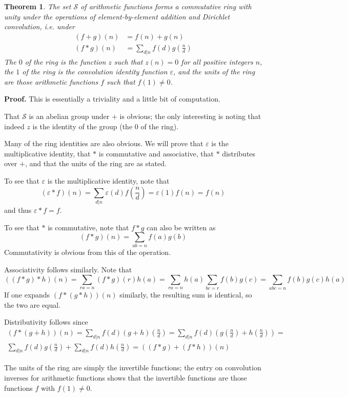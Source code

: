 \documentclass[12pt]{article}
\newtheorem{thm}{Theorem}
\begin{document}
\begin{thm} The set $\mathcal{S}$ of arithmetic functions forms a commutative ring with unity under the operations of element-by-element addition and Dirichlet convolution, i.e. under
\begin{align*}(f+g)(n)&=f(n)+g(n)\\
(f*g)(n)&=\sum_{d|n} f(d)g\left(\frac{n}{d}\right)
\end{align*}
The $0$ of the ring is the function $z$ such that $z(n)=0$ for all positive integers $n$, the $1$ of the ring is the convolution identity function $\varepsilon$, and the units of the ring are those arithmetic functions $f$ such that $f(1)\neq 0$.
\end{thm}

\textbf{Proof.}
This is essentially a triviality and a little bit of computation.

That $\mathcal{S}$ is an abelian group under $+$ is obvious; the only interesting  is noting that indeed $z$ is the identity of the group (the $0$ of the ring).

Many of the ring identities are also obvious. We will prove that  $\varepsilon$ is the multiplicative identity, that $*$ is commutative and associative, that $*$ distributes over $+$, and that the units of the ring are as stated.

To see that $\varepsilon$ is the multiplicative identity, note that
\[(\varepsilon*f)(n)=\sum_{d|n} \varepsilon(d)f\left(\frac{n}{d}\right)=\varepsilon(1)f(n)=f(n)\]
and thus $\varepsilon*f=f$.

To see that $*$ is commutative, note that $f*g$ can also be written as
\[(f*g)(n)=\sum_{ab=n}f(a)g(b)\]
Commutativity is obvious from this  of the operation.

Associativity follows similarly. Note that
\[((f*g)*h)(n)= \sum_{ra=n}(f*g)(r)h(a)=\sum_{ra=n}h(a)\sum_{bc=r}f(b)g(c)=\sum_{abc=n}f(b)g(c)h(a)\]
If one expands $(f*(g*h))(n)$ similarly, the resulting sum is identical, so the two are equal.

Distributivity follows since
\begin{multline*}(f*(g+h))(n)=\sum_{d|n}f(d)\left(g+h\right)\left(\frac{n}{d}\right)=\sum_{d|n}f(d)\left(g\left(\frac{n}{d}\right)+h\left(\frac{n}{d}\right)\right)=\\
\sum_{d|n}f(d)g\left(\frac{n}{d}\right)+\sum_{d|n}f(d)h\left(\frac{n}{d}\right)=((f*g)+(f*h))(n)
\end{multline*}

The units of the ring are simply the invertible functions; the entry on convolution inverses for arithmetic functions shows that the invertible functions are those functions $f$ with $f(1)\neq 0$.

\end{document}
